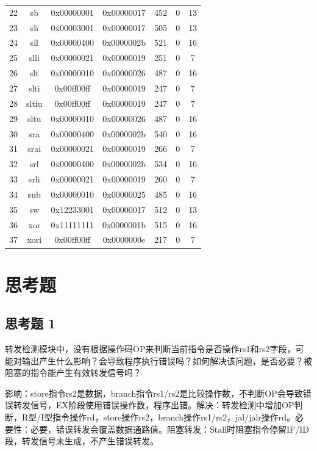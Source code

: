\documentclass[UTF8,a4paper,11pt]{ctexart}
\newcommand{\placeholder}[1]{
\begin{tcolorbox}[colback=sub,colframe=main,boxrule=0.6pt,arc=2mm,left=2mm,right=2mm,top=1mm,bottom=1mm]
#1
\end{tcolorbox}
}
\newcommand{\answerbox}[2][3.2cm]{%
\begin{tcolorbox}[colback=white,colframe=main,boxrule=0.6pt,arc=2mm,left=2mm,right=2mm,top=1mm,bottom=1mm]
\begin{minipage}[t]{\linewidth}
#2
\end{minipage}
\end{tcolorbox}
}
\begin{document}
{\begin{center}
\begin{tabular}{ccccccc}
22 & sb & 0x00000001 & 0x00000017 & 452 & 0 & 13 \\
23 & sh & 0x00003001 & 0x00000017 & 505 & 0 & 13 \\
24 & sll & 0x00000400 & 0x0000002b & 521 & 0 & 16 \\
25 & slli & 0x00000021 & 0x00000019 & 251 & 0 & 7 \\
26 & slt & 0x00000010 & 0x00000026 & 487 & 0 & 16 \\
27 & slti & 0x00ff00ff & 0x00000019 & 247 & 0 & 7 \\
28 & sltiu & 0x00ff00ff & 0x00000019 & 247 & 0 & 7 \\
29 & sltu & 0x00000010 & 0x00000026 & 487 & 0 & 16 \\
30 & sra & 0x00000400 & 0x0000002b & 540 & 0 & 16 \\
31 & srai & 0x00000021 & 0x00000019 & 266 & 0 & 7 \\
32 & srl & 0x00000400 & 0x0000002b & 534 & 0 & 16 \\
33 & srli & 0x00000021 & 0x00000019 & 260 & 0 & 7 \\
34 & sub & 0x00000010 & 0x00000025 & 485 & 0 & 16 \\
35 & sw & 0x12233001 & 0x00000017 & 512 & 0 & 13 \\
36 & xor & 0x11111111 & 0x0000001b & 515 & 0 & 16 \\
37 & xori & 0x00ff00ff & 0x0000000e & 217 & 0 & 7 \\
\bottomrule
\end{tabular}
\end{center}
}

\section{思考题}

\subsection{思考题 1}
\placeholder{转发检测模块中，没有根据操作码OP来判断当前指令是否操作rs1和rs2字段，可能对输出产生什么影响？会导致程序执行错误吗？如何解决该问题，是否必要？被阻塞的指令能产生有效转发信号吗？}
\answerbox{影响：store指令rs2是数据，branch指令rs1/rs2是比较操作数，不判断OP会导致错误转发信号，EX阶段使用错误操作数，程序出错。解决：转发检测中增加OP判断，R型/I型指令操作rd，store操作rs2，branch操作rs1/rs2，jal/jalr操作rd。必要性：必要，错误转发会覆盖数据通路值。阻塞转发：Stall时阻塞指令停留IF/ID段，转发信号未生成，不产生错误转发。}
\end{document}
